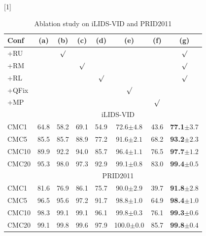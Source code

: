 \documentclass[letterpaper]{article} %
\begin{document}
\begin{table}[t]
\centering

\caption{Ablation study on iLIDS-VID and PRID2011}
\scalebox{0.8}[1]{

\begin{tabular}{l|c c c c c c c}
\hline
 Conf &(a)&(b)&(c)&(d)&(e)&(f)&(g) \\
  \hline
+RU &  & $\surd$ &  & & & &$\surd$\\
+RM &  & & $\surd$ & & & &$\surd$\\
+RL&  & &  & $\surd$& & &$\surd$\\
+QFix&  & &  & & $\surd$& & \\
+MP&  & &  & & &$\surd$& \\
\hline
 & \multicolumn{7}{c}{iLIDS-VID} \\
\hline
CMC1 & 64.8 & 58.2& 69.1 & 54.9& 72.6$\pm4.8$& 43.6& {\bf77.1$\pm3.7$}\\
CMC5 & 85.5 & 85.7& 88.9 & 77.2& 91.6$\pm2.1$& 68.2&{\bf93.2$\pm2.3$}\\
CMC10& 89.9 & 92.2& 94.0 & 85.7& 96.4$\pm1.1$& 76.5& {\bf97.7$\pm1.2$}\\
CMC20& 95.3 & 98.0& 97.3 & 92.9& 99.1$\pm0.8$& 83.0& {\bf99.4$\pm0.5$}\\
\hline
  & \multicolumn{7}{c}{PRID2011} \\
\hline
CMC1 & 81.6 & 76.9& 86.1 & 75.7& 90.0$\pm2.9$& 39.7& {\bf91.8$\pm2.8$}\\
CMC5 & 96.5 & 95.6& 97.2 & 91.7& 98.8$\pm1.0$& 64.9&{\bf98.4$\pm1.0$}\\
CMC10& 98.3 & 99.1& 99.1 & 96.1& 99.8$\pm0.3$& 76.1& {\bf99.3$\pm0.6$}\\
CMC20& 99.1 & 99.8& 99.6 & 97.9& 100.0$\pm0.0$& 85.7& {\bf99.8$\pm0.4$}\\
\hline
\end{tabular}}

\label{table:ablation}
\end{table}
\end{document}
